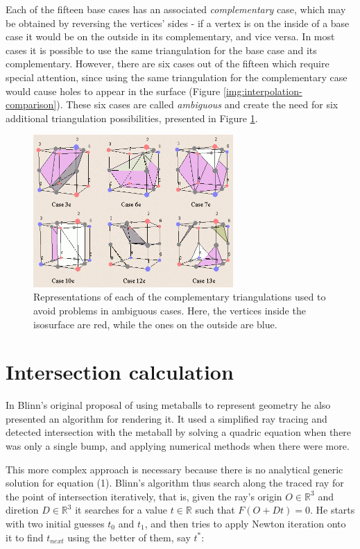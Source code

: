\documentclass[conference]{acmsiggraph}
\begin{document}
Each of the fifteen base cases has an associated \textit{complementary} case, which may be obtained by reversing the vertices' sides - if a vertex is on the inside of a base case it would be on the outside in its complementary, and vice versa. In most cases it is possible to use the same triangulation for the base case and its complementary. However, there are six cases out of the fifteen which require special attention, since using the same triangulation for the complementary case would cause holes to appear in the surface (Figure \ref{img:interpolation-comparison}). These six cases are called \textit{ambiguous} and create the need for six additional triangulation possibilities, presented in Figure \ref{img:ambiguous-cases}.

\begin{figure}[ht]
  \centering
  \includegraphics[width=3in]{images/ambiguous-cases}
  \caption{Representations of each of the complementary triangulations used to avoid problems in ambiguous cases. Here, the vertices inside the isosurface are red, while the ones on the outside are blue.}
  \label{img:ambiguous-cases}
\end{figure}

\section{Intersection calculation}

In Blinn's  original proposal of using
metaballs to represent geometry he also presented an algorithm for rendering it.
It used a simplified ray tracing and detected intersection with the metaball
by solving a quadric equation when there was only a single bump, and applying
numerical methods when there were more.

This more complex approach is necessary because there is no analytical generic
solution for equation (1). Blinn's algorithm thus search along the traced ray
for the point of intersection iteratively, that is, given the ray's origin
$O\in\mathbb{R}^3$ and diretion $D\in\mathbb{R}^3$ it searches for a value
$t\in\mathbb{R}$ such that $F(O + Dt) = 0$. He starts with two initial guesses
$t_0$ and $t_1$, and then tries to apply Newton iteration onto it to find
$t_{next}$ using the better of them, say $t^*$:
\end{document}
